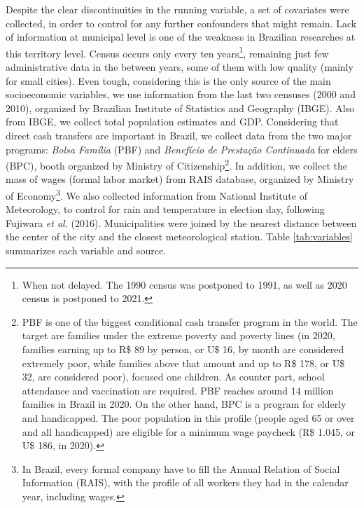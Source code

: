 \documentclass[
  12pt,
]{article}
\begin{document}
Despite the clear discontinuities in the running variable, a set of
covariates were collected, in order to control for any further
confounders that might remain. Lack of information at municipal level is
one of the weakness in Brazilian researches at this territory level.
Census occurs only every ten years\footnote{When not delayed. The 1990
  census was postponed to 1991, as well as 2020 census is postponed to
  2021.}, remaining just few administrative data in the between years,
some of them with low quality (mainly for small cities). Even tough,
considering this is the only source of the main socioeconomic variables,
we use information from the last two censuses (2000 and 2010), organized
by Brazilian Institute of Statistics and Geography (IBGE). Also from
IBGE, we collect total population estimates and GDP. Considering that
direct cash transfers are important in Brazil, we collect data from the
two major programs: \emph{Bolsa Família} (PBF) and \emph{Benefício de
Prestação Continuada} for elders (BPC), booth organized by Ministry of
Citizenship\footnote{PBF is one of the biggest conditional cash transfer
  program in the world. The target are families under the extreme
  poverty and poverty lines (in 2020, families earning up to R\$ 89 by
  person, or U\$ 16, by month are considered extremely poor, while
  families above that amount and up to R\$ 178, or U\$ 32, are
  considered poor), focused one children. As counter part, school
  attendance and vaccination are required. PBF reaches around 14 million
  families in Brazil in 2020. On the other hand, BPC is a program for
  elderly and handicapped. The poor population in this profile (people
  aged 65 or over and all handicapped) are eligible for a minimum wage
  paycheck (R\$ 1.045, or U\$ 186, in 2020).}. In addition, we collect
the mass of wages (formal labor market) from RAIS database, organized by
Ministry of Economy\footnote{In Brazil, every formal company have to
  fill the Annual Relation of Social Information (RAIS), with the
  profile of all workers they had in the calendar year, including wages.}.
We also collected information from National Institute of Meteorology, to
control for rain and temperature in election day, following Fujiwara
\emph{et al.} (2016). Municipalities were joined by the nearest distance
between the center of the city and the closest meteorological station.
Table \ref{tab:variables} summarizes each variable and source.
\end{document}
